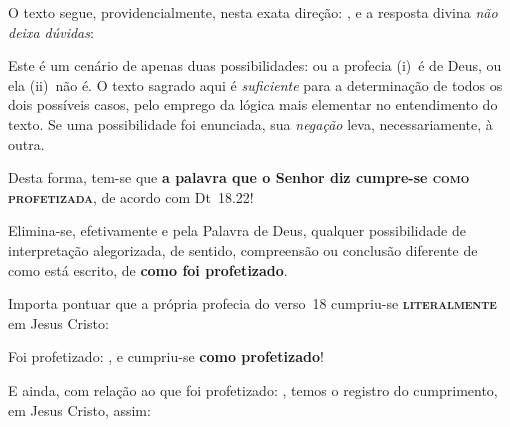     O texto segue, providencialmente, nesta exata direção: , e a resposta divina \emph{não deixa dúvidas}:


    Este é um cenário de apenas duas possibilidades: ou a profecia (i)~é de Deus, ou ela (ii)~não é.  O  texto  sagrado  aqui  é
    \emph{suficiente} para a determinação de  todos  os  dois  possíveis  casos,  pelo  emprego  da  lógica  mais  elementar  no
    entendimento do texto. Se uma possibilidade foi enunciada, sua \emph{negação} leva, necessariamente, à outra.

    Desta forma, tem-se que \textbf{a palavra que o Senhor diz cumpre-se \textsc{como profetizada}}, de acordo com Dt~18.22!

    Elimina-se, efetivamente e  pela  Palavra  de  Deus,  qualquer  possibilidade  de  interpretação  alegorizada,  de  sentido,
    compreensão ou conclusão diferente de como está escrito, de \textbf{como foi profetizado}.

    Importa pontuar que a própria profecia do verso~18 cumpriu-se \textbf{\textsc{literalmente}} em Jesus Cristo:
 

    Foi profetizado: , e cumpriu-se \textbf{como profetizado}!

    E ainda, com relação ao que foi profetizado: ,  temos  o  registro  do
    cumprimento, em Jesus Cristo, assim:


